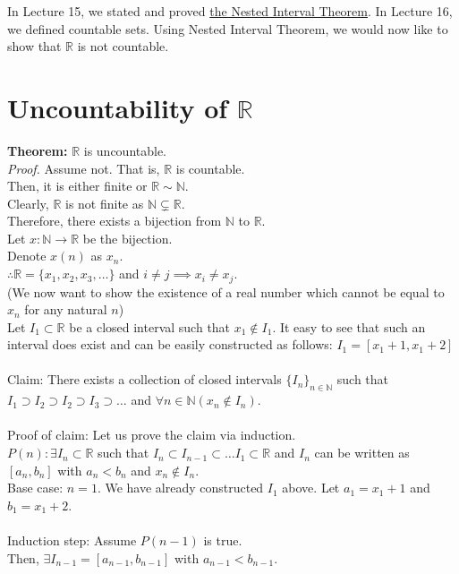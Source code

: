 In Lecture 15, we stated and proved \hyperref[sec:nestedint]{the Nested Interval Theorem}. In Lecture 16, we defined countable sets. Using Nested Interval Theorem, we would now like to show that $\mathbb{R}$ is not countable.
\section{Uncountability of $\mathbb{R}$}\label{sec:uncountableR}
\textbf{Theorem: }$\mathbb{R}$ is uncountable.\\
\textit{Proof. }Assume not. That is, $\mathbb{R}$ is countable.\\
Then, it is either finite or $\mathbb{R}\sim\mathbb{N}$.\\
Clearly, $\mathbb{R}$ is not finite as $\mathbb{N}\subsetneq\mathbb{R}$.\\
Therefore, there exists a bijection from $\mathbb{N}$ to $\mathbb{R}$.\\
Let $x:\mathbb{N}\to\mathbb{R}$ be the bijection.\\
Denote $x(n)$ as $x_n$.\\
$\therefore \mathbb{R} = \{x_1, x_2, x_3, \dots\}$ and $i\neq j\implies x_i\neq x_j$.\\
(We now want to show the existence of a real number which cannot be equal to $x_n$ for any natural $n$)\\
Let $I_1\subset\mathbb{R}$ be a closed interval such that $x_1\not\in I_1$. It easy to see that such an interval does exist and can be easily constructed as follows: $I_1 = [x_1 + 1, x_1 + 2]$\\~\\
Claim: There exists a collection of closed intervals $\{I_n\}_{n\in\mathbb{N}}$ such that $I_1\supset I_2 \supset I_2 \supset I_3 \supset \dots$ and $\forall n\in\mathbb{N}(x_n\not\in I_n)$.\\~\\
Proof of claim: Let us prove the claim via induction.\\
    $P(n): \exists I_n \subset \mathbb{R}$ such that $I_n \subset I_{n-1} \subset \dots I_1 \subset \mathbb{R}$ and $I_n$ can be written as $[a_n, b_n]$ with $a_n < b_n$ and $x_n\not\in I_n$.\\
    Base case: $n = 1$. We have already constructed $I_1$ above. Let $a_1 = x_1+1$ and $b_1 = x_1 + 2$.\\~\\
    Induction step: Assume $P(n-1)$ is true.\\
    Then, $\exists I_{n-1} = [a_{n-1}, b_{n-1}]$ with $a_{n-1}<b_{n-1}$.\\
